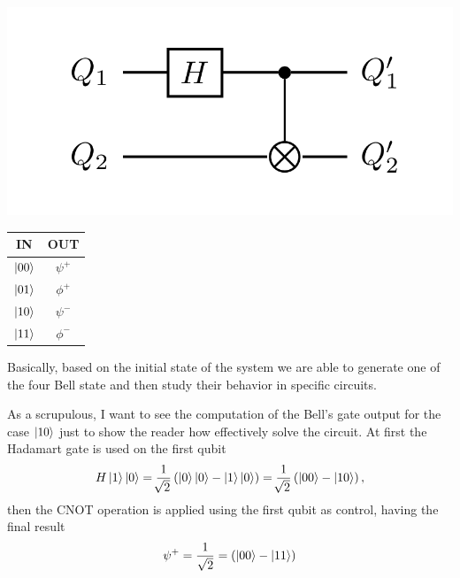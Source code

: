 \begin{minipage}{0.45\textwidth}
    \centering
    \includegraphics[width=\textwidth]{Immagini/BellCirc.pdf}
\end{minipage}
\hspace{-1cm}
\begin{minipage}{0.45\textwidth}
    \centering
    \begin{tabular}{c|c}
        \textbf{IN} & \textbf{OUT}\\
        \midrule
        $\ket{00}$ & $\psi^+$\\
        $\ket{01}$ & $\phi^+$\\
        $\ket{10}$ & $\psi^-$\\
        $\ket{11}$ & $\phi^-$
    \end{tabular}
\end{minipage}
\vspace{0.3cm}

\noindent
Basically, based on the initial state of the system we are able to generate one of the four Bell state and then study their behavior in specific circuits. 

{
    As a scrupulous, I want to see the computation of the Bell's gate output for the case $\ket{10}$ just to show the reader how effectively solve the circuit. At first the Hadamart gate is used on the first qubit
    \begin{equation}
        H\ket{1}\ket{0} = \frac{1}{\sqrt[]{2}}\left( \ket{0}\ket{0} - \ket{1}\ket{0} \right) = \frac{1}{\sqrt[]{2}}\left( \ket{00} - \ket{10} \right),
    \end{equation}
    then the CNOT operation is applied using the first qubit as control, having the final result
    \begin{equation}
        \psi^+ = \frac{1}{\sqrt{2}} = \left( \ket{00} - \ket{11} \right)
    \end{equation}
}